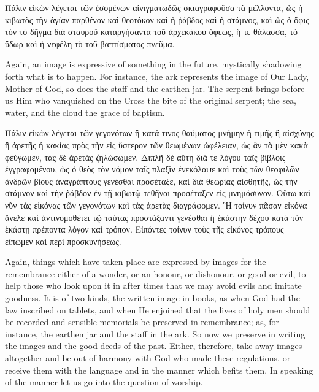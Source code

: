 \documentclass[10pt]{book}
\newcommand{\switchGreek}[1][]{\selectlanguage{polutonikogreek} \switchcolumn*[#1]}
\newcommand{\switchEnglish}{\selectlanguage{english} \switchcolumn}
\begin{document}
\begin{paracol}{2}
\switchGreek

Πάλιν εἰκὼν λέγεται τῶν ἐσομένων αἰνιγματωδῶς σκιαγραφοῦσα τὰ μέλλοντα, ὡς ἡ κιβωτὸς τὴν ἁγίαν παρθένον καὶ θεοτόκον καὶ ἡ ῥάβδος καὶ ἡ στάμνος, καὶ ὡς ὁ ὄφις τὸν τὸ δῆγμα διὰ σταυροῦ καταργήσαντα τοῦ ἀρχεκάκου ὄφεως, ἥ τε θάλασσα, τὸ ὕδωρ καὶ ἡ νεφέλη τὸ τοῦ βαπτίσματος πνεῦμα.

\switchEnglish

Again, an image is expressive of something 
in the future, mystically shadowing forth what 
is to happen. For instance, the ark represents 
the image of Our Lady, Mother of God, so 
does the staff and the earthen jar. The serpent 
brings before us Him who vanquished on the 
Cross the bite of the original serpent; the sea, 
water, and the cloud the grace of baptism. 

\switchGreek

Πάλιν εἰκὼν λέγεται τῶν γεγονότων ἢ κατά τινος θαύματος μνήμην ἢ τιμῆς ἢ αἰσχύνης ἢ ἀρετῆς ἢ κακίας πρὸς τὴν εἰς ὕστερον τῶν θεωμένων ὠφέλειαν, ὡς ἂν τὰ μὲν κακὰ φεύγωμεν, τὰς δὲ ἀρετὰς ζηλώσωμεν. Διπλῆ δὲ αὕτη διά τε λόγου ταῖς βίβλοις ἐγγραφομένου, ὡς ὁ θεὸς τὸν νόμον ταῖς πλαξὶν ἐνεκόλαψε καὶ τοὺς τῶν θεοφιλῶν ἀνδρῶν βίους ἀναγράπτους γενέσθαι προσέταξε, καὶ διὰ θεωρίας αἰσθητῆς, ὡς τὴν στάμνον καὶ τὴν ῥάβδον ἐν τῇ κιβωτῷ τεθῆναι προσέταξεν εἰς μνημόσυνον. Οὕτω καὶ νῦν τὰς εἰκόνας τῶν γεγονότων καὶ τὰς ἀρετὰς διαγράφομεν. Ἢ τοίνυν πᾶσαν εἰκόνα ἄνελε καὶ ἀντινομοθέτει τῷ ταύτας προστάξαντι γενέσθαι ἢ ἑκάστην δέχου κατὰ τὸν ἑκάστῃ πρέποντα λόγον καὶ τρόπον. Εἰπόντες τοίνυν τοὺς τῆς εἰκόνος τρόπους εἴπωμεν καὶ περὶ προσκυνήσεως.

\switchEnglish

Again, things which have taken place are 
expressed by images for the remembrance 
either of a wonder, or an honour, or dishonour, 
or good or evil, to help those who look upon 
it in after times that we may avoid evils and 
imitate goodness. It is of two kinds, the 
written image in books, as when God had the 
law inscribed on tablets, and when He enjoined 
that the lives of holy men should be recorded 
and sensible memorials be preserved in remembrance; as, for instance, the earthen jar 
and the staff in the ark. So now we preserve 
in writing the images and the good deeds of 
the past. Either, therefore, take away images 
altogether and be out of harmony with God 
who made these regulations, or receive them 
with the language and in the manner which 
befits them. In speaking of the manner let us 
go into the question of worship. 


\end{paracol}
\end{document}
